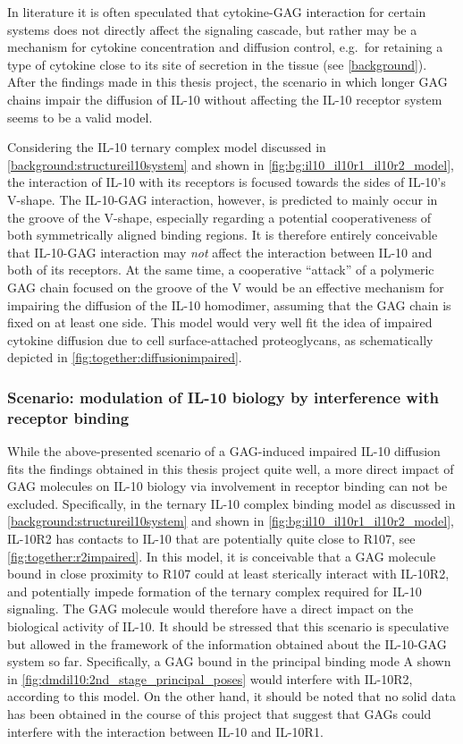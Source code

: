 In literature it is often speculated that cytokine-GAG interaction for certain
systems does not directly affect the signaling cascade, but rather may be a
mechanism for cytokine concentration and diffusion control, e.g.\ for retaining
a type of cytokine close to its site of secretion in the tissue (see
\cref{background}). After the findings made in this thesis project, the scenario
in which longer GAG chains impair the diffusion of IL-10 without affecting the
IL-10 receptor system seems to be a valid model.

Considering the IL-10 ternary complex model discussed in
\cref{background:structureil10system} and shown in
\cref{fig:bg:il10_il10r1_il10r2_model}, the interaction of IL-10 with its
receptors is focused towards the sides of IL-10's V-shape. The IL-10-GAG
interaction, however, is predicted to mainly occur in the groove of the V-shape,
especially regarding a potential cooperativeness of both symmetrically aligned
binding regions. It is therefore entirely conceivable that IL-10-GAG interaction
may \textit{not} affect the interaction between IL-10 and both of its
receptors. At the same time, a cooperative \enquote{attack} of a polymeric GAG
chain focused on the groove of the V would be an effective mechanism for
impairing the diffusion of the IL-10 homodimer, assuming that the GAG chain is
fixed on at least one side. This model would very well fit the idea of impaired
cytokine diffusion due to cell surface-attached proteoglycans, as schematically
depicted in \cref{fig:together:diffusionimpaired}.


\subsubsection{Scenario: modulation of IL-10 biology by interference with
receptor binding}

While the above-presented scenario of a GAG-induced impaired IL-10 diffusion
fits the findings obtained in this thesis project quite well, a more direct
impact of GAG molecules on IL-10 biology via involvement in receptor binding can
not be excluded. Specifically, in the ternary IL-10 complex binding model as
discussed in \cref{background:structureil10system} and shown in
\cref{fig:bg:il10_il10r1_il10r2_model}, IL-10R2 has contacts to IL-10 that
are potentially quite close to R107, see \cref{fig:together:r2impaired}. In this
model, it is conceivable that a GAG molecule bound in close proximity to R107
could at least sterically interact with IL-10R2, and potentially impede
formation of the ternary complex required for IL-10 signaling. The GAG molecule
would therefore have a direct impact on the biological activity of IL-10. It
should be stressed that this scenario is speculative but allowed in the
framework of the information obtained about the IL-10-GAG system so far.
Specifically, a GAG bound in the principal binding mode A shown in
\cref{fig:dmdil10:2nd_stage_principal_poses} would interfere with IL-10R2,
according to this model. On the other hand, it should be noted that no solid
data has been obtained in the course of this project that suggest that GAGs
could interfere with the interaction between IL-10 and IL-10R1.

